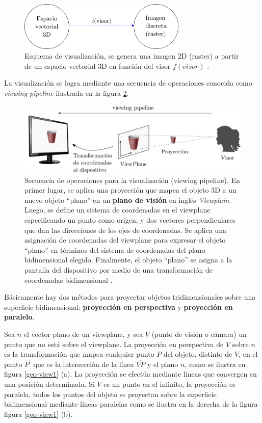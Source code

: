 \begin{figure}[ht]
\includegraphics[width=8cm]{Img/CPD/grafica3.png}
\centering
\caption{\footnotesize{Esquema de visualización, se genera una imagen 2D (raster) a partir de un espacio vectorial 3D en función del visor $f(visor)$ \citep{Ramos2011}.}}
\label{fig:grafica3}
\end{figure}


La visualización se logra mediante una secuencia de operaciones conocida como \textit{viewing pipeline} \citep{marsh2005applied} ilustrada en la figura \ref{fig:view0}. 

\begin{figure}[ht]
\includegraphics[width=13cm]{Img/GEO/geo-view001.png}
\centering
\caption{\footnotesize{Secuencia de operaciones para la visualización (viewing pipeline). En primer lugar, se aplica una proyección que mapea el objeto 3D a un nuevo objeto ``plano'' en un \textbf{plano de visión} en inglés \textit{Viewplain}.
Luego, se define un sistema de coordenadas en el viewplane especificando un punto como origen, y dos vectores perpendiculares que dan las direcciones de los ejes de coordenadas. Se aplica una asignación de coordenadas del viewplane para expresar el objeto ``plano'' en términos del sistema de coordenadas del plano bidimensional elegido. Finalmente, el objeto ``plano'' se asigna a la pantalla del dispositivo por medio de una transformación de coordenadas bidimensional \citep{marsh2005applied}.}}
\label{fig:view0}
\end{figure}


Básicamente hay dos métodos para proyectar objetos tridimensionales sobre una superficie bidimensional:  \textbf{proyección en perspectiva} y \textbf{proyección en paralelo}. 

Sea $n$ el vector plano de un viewplane, y sea $V$ (punto de visión o cámara) un punto que no está sobre el viewplane. La proyección en perspectiva de $V$ sobre $n$ es la transformación que mapea cualquier punto $P$ del objeto, distinto de $V$, en el punto $P^{\prime}$ que es la intersección de la línea $\overline{VP}$ y el plano $n$, como se ilustra en figura \ref{geo-view1} (a). La proyección se efectúa mediante líneas que convergen en una posición determinada. Si $V$ es un punto en el infinito, la proyección es paralela, todos los puntos del objeto se proyectan sobre la superficie bidimensional mediante líneas paralelas como se ilustra en la derecha de la figura figura \ref{geo-view1} (b).

